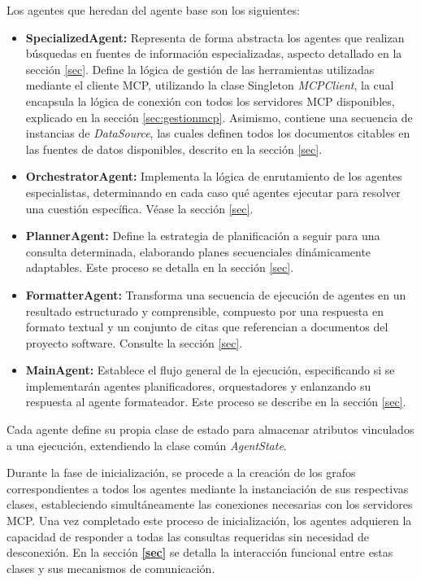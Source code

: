 Los agentes que heredan del agente base son los siguientes:
\begin{itemize}
\item \textbf{SpecializedAgent:} Representa de forma abstracta los agentes que realizan búsquedas en fuentes de información especializadas, aspecto detallado en la sección \ref{sec}. Define la lógica de gestión de las herramientas utilizadas mediante el cliente MCP, utilizando la clase Singleton \textit{MCPClient}, la cual encapsula la lógica de conexión con todos los servidores MCP disponibles, explicado en la sección \ref{sec:gestionmcp}. Asimismo, contiene una secuencia de instancias de \textit{DataSource}, las cuales definen todos los documentos citables en las fuentes de datos disponibles, descrito en la sección \ref{sec}.
\item \textbf{OrchestratorAgent:} Implementa la lógica de enrutamiento de los agentes especialistas, determinando en cada caso qué agentes ejecutar para resolver una cuestión específica. Véase la sección \ref{sec}.
\item \textbf{PlannerAgent:} Define la estrategia de planificación a seguir para una consulta determinada, elaborando planes secuenciales dinámicamente adaptables. Este proceso se detalla en la sección \ref{sec}.
\item \textbf{FormatterAgent:} Transforma una secuencia de ejecución de agentes en un resultado estructurado y comprensible, compuesto por una respuesta en formato textual y un conjunto de citas que referencian a documentos del proyecto software. Consulte la sección \ref{sec}.
\item \textbf{MainAgent:} Establece el flujo general de la ejecución, especificando si se implementarán agentes planificadores, orquestadores y enlanzando su respuesta al agente formateador. Este proceso se describe en la sección \ref{sec}.
\end{itemize}
Cada agente define su propia clase de estado para almacenar atributos vinculados a una ejecución, extendiendo la clase común \textit{AgentState}.

Durante la fase de inicialización, se procede a la creación de los grafos correspondientes a todos los agentes mediante la instanciación de sus respectivas clases, estableciendo simultáneamente las conexiones necesarias con los servidores MCP. Una vez completado este proceso de inicialización, los agentes adquieren la capacidad de responder a todas las consultas requeridas sin necesidad de desconexión. En la sección \textbf{\ref{sec}} se detalla la interacción funcional entre estas clases y sus mecanismos de comunicación.

